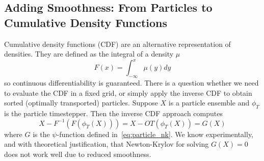 \documentclass{article}
\begin{document}
\subsection{Adding Smoothness: From Particles to Cumulative Density Functions}
Cumulative density functions (CDF) are an alternative representation of densities. They are defined as the integral of a density $\mu$
\begin{equation} \label{eq:cdf}
    F(x) = \int_{-\infty}^x \mu(y) dy
\end{equation}
so continuous differentiability is guaranteed. There is a question whether we need to evaluate the CDF in a fixed grid, or simply apply the inverse CDF to obtain sorted (optimally transported) particles. Suppose $X$ is a particle ensemble and $\phi_T$ is the particle timestepper. Then the inverse CDF approach computes
\begin{equation} \label{eq:inverse_cdf}
    X - F^{-1}\left(F\left(\phi_T(X)\right)\right) = X - OT(\phi_T(X)) = G(X)
\end{equation}
where $G$ is the $\psi$-function defined in~\eqref{eq:particle_nk}. We know experimentally, and with theoretical justification, that Newton-Krylov for solving $G(X) = 0$ does not work well due to reduced smoothness.
\end{document}
